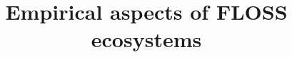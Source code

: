 \documentclass[11pt]{book}
\begin{document}
\title{Empirical aspects of FLOSS ecosystems}

\maketitle








\end{document}
